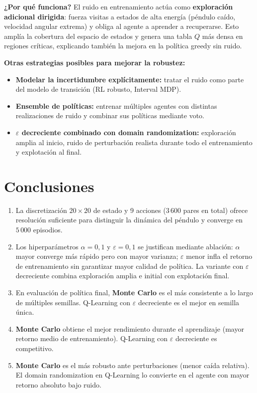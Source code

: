 \documentclass[12pt,a4paper]{article}
\begin{document}
\textbf{¿Por qué funciona?} El ruido en entrenamiento actúa como
\textbf{exploración adicional dirigida}: fuerza visitas a estados de alta energía
(péndulo caído, velocidad angular extrema) y obliga al agente a aprender a
recuperarse. Esto amplía la cobertura del espacio de estados y genera una tabla $Q$
más densa en regiones críticas, explicando también la mejora en la política greedy
sin ruido.

\textbf{Otras estrategias posibles para mejorar la robustez:}
\begin{itemize}
  \item \textbf{Modelar la incertidumbre explícitamente:} tratar el ruido como
        parte del modelo de transición (RL robusto, Interval MDP).
  \item \textbf{Ensemble de políticas:} entrenar múltiples agentes con distintas
        realizaciones de ruido y combinar sus políticas mediante voto.
  \item \textbf{$\varepsilon$ decreciente combinado con domain randomization:}
        exploración amplia al inicio, ruido de perturbación realista durante todo
        el entrenamiento y explotación al final.
\end{itemize}

\section{Conclusiones}

\begin{enumerate}
  \item La discretización $20\times20$ de estado y 9 acciones ($3\,600$ pares
        en total) ofrece resolución suficiente para distinguir la dinámica del péndulo
        y converge en $5\,000$ episodios.
  \item Los hiperparámetros $\alpha=0{,}1$ y $\varepsilon=0{,}1$ se justifican
        mediante ablación: $\alpha$ mayor converge más rápido pero con mayor
        varianza; $\varepsilon$ menor infla el retorno de entrenamiento sin garantizar
        mayor calidad de política. La variante con $\varepsilon$ decreciente combina
        exploración amplia e initial con explotación final.
  \item En evaluación de política final, \textbf{Monte Carlo} es el más consistente
        a lo largo de múltiples semillas. Q-Learning con $\varepsilon$ decreciente
        es el mejor en semilla única.
  \item \textbf{Monte Carlo} obtiene el mejor rendimiento durante el aprendizaje
        (mayor retorno medio de entrenamiento). Q-Learning con $\varepsilon$
        decreciente es competitivo.
  \item \textbf{Monte Carlo} es el más robusto ante perturbaciones (menor caída
        relativa). El domain randomization en Q-Learning lo convierte en el agente
        con mayor retorno absoluto bajo ruido.
\end{enumerate}
\end{document}
